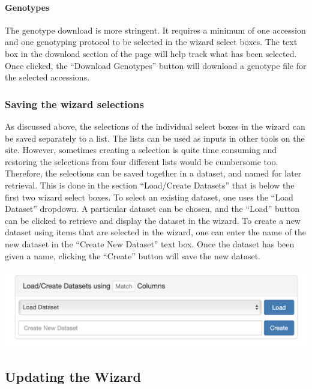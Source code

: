 \documentclass[
  12pt,
]{book}
\begin{document}
\hypertarget{genotypes}{%
\paragraph*{Genotypes}\label{genotypes}}

The genotype download is more stringent. It requires a minimum of one accession and one genotyping protocol to be selected in the wizard select boxes. The text box in the download section of the page will help track what has been selected. Once clicked, the ``Download Genotypes'' button will download a genotype file for the selected accessions.

\hypertarget{saving-the-wizard-selections}{%
\subsubsection*{Saving the wizard selections}\label{saving-the-wizard-selections}}


As discussed above, the selections of the individual select boxes in the wizard can be saved separately to a list. The lists can be used as inputs in other tools on the site. However, sometimes creating a selection is quite time consuming and restoring the selections from four different lists would be cumbersome too. Therefore, the selections can be saved together in a dataset, and named for later retrieval. This is done in the section ``Load/Create Datasets'' that is below the first two wizard select boxes. To select an existing dataset, one uses the ``Load Dataset'' dropdown. A particular dataset can be chosen, and the ``Load'' button can be clicked to retrieve and display the dataset in the wizard. To create a new dataset using items that are selected in the wizard, one can enter the name of the new dataset in the ``Create New Dataset'' text box. Once the dataset has been given a name, clicking the ``Create'' button will save the new dataset.

\begin{center}\includegraphics[width=0.75\linewidth]{assets/images/wizard_load_create_dataset} \end{center}

\hypertarget{updating-the-wizard}{%
\subsection{Updating the Wizard}\label{updating-the-wizard}}
\end{document}

